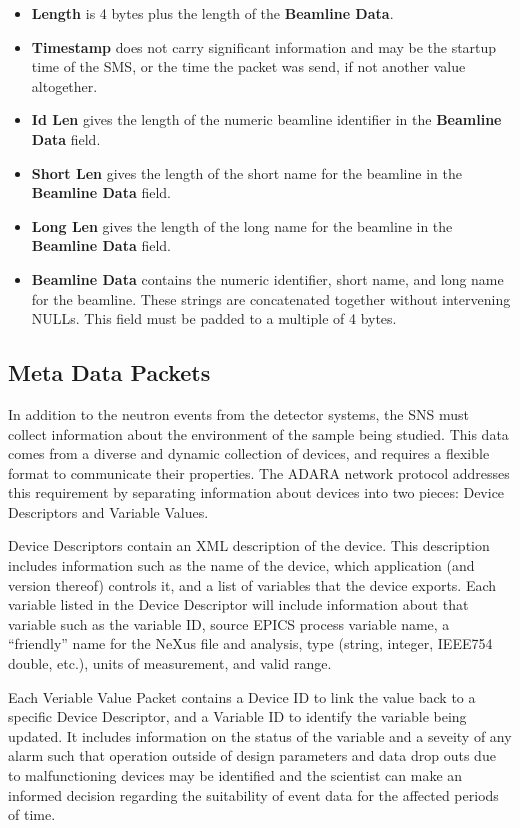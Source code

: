 \begin{itemize}
\item{\bf Length} is 4 bytes plus the length of the {\bf Beamline Data}.
\item{\bf Timestamp} does not carry significant information and may be the
startup time of the SMS, or the time the packet was send, if not another value
altogether.
\item{\bf Id Len} gives the length of the numeric beamline identifier in the
{\bf Beamline Data} field.
\item{\bf Short Len} gives the length of the short name for the beamline in the
{\bf Beamline Data} field.
\item{\bf Long Len} gives the length of the long name for the beamline in the
{\bf Beamline Data} field.
\item{\bf Beamline Data} contains the numeric identifier, short name, and long
name for the beamline. These strings are concatenated together without
intervening NULLs. This field must be padded to a multiple of 4 bytes.
\end{itemize}

\newpage
\subsection{Meta Data Packets}
\label{section:protocol_meta_data_packets}

In addition to the neutron events from the detector systems, the SNS must
collect information about the environment of the sample being studied. This
data comes from a diverse and dynamic collection of devices, and requires
a flexible format to communicate their properties. The ADARA network
protocol addresses this requirement by separating information about devices
into two pieces: Device Descriptors and Variable Values.

Device Descriptors contain an XML description of the device. This description
includes information such as the name of the device, which application (and
version thereof) controls it, and a list of variables that the device exports.
Each variable listed in the Device Descriptor will include information about
that variable such as the variable ID, source EPICS process variable name, a
``friendly'' name for the NeXus file and analysis, type (string, integer,
IEEE754 double, etc.), units of measurement, and valid range.

Each Veriable Value Packet contains a Device ID to link the value back
to a specific Device Descriptor, and a Variable ID to identify the variable
being updated. It includes information on the status of the variable
and a seveity of any alarm such that operation outside of design parameters
and data drop outs due to malfunctioning devices may be identified and
the scientist can make an informed decision regarding the suitability
of event data for the affected periods of time.

